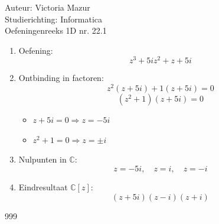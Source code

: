 \documentclass[a4paper,fleqn]{article}
\begin{document}
  
\noindent \large Auteur: Victoria Mazur \\
\noindent \large Studierichting: Informatica\\
\noindent \large Oefeningenreeks 1D nr. 22.1\\

\medskip

\normalsize

\begin{enumerate}
    \item Oefening:
    $$
    z^3 + 5i z^2 + z + 5i
    $$

    \item Ontbinding in factoren:
    $$
    z^2(z + 5i) + 1(z + 5i) = 0
    $$
    $$
    (z^2 + 1)(z + 5i) = 0
    $$
    \begin{itemize}
        \item \( z + 5i = 0 \Rightarrow z = -5i \)
        \item \( z^2 + 1 = 0 \Rightarrow z = \pm i \)
    \end{itemize}

    \item Nulpunten in \(\mathbb{C}\):
    $$
    z = -5i, \quad z = i, \quad z = -i
    $$

    \item Eindresultaat \(\mathbb{C}[z]\):
    $$
    (z + 5i)(z - i)(z + i)
    $$
\end{enumerate}

\begin{thebibliography}{999}
\end{thebibliography}
\end{document}
